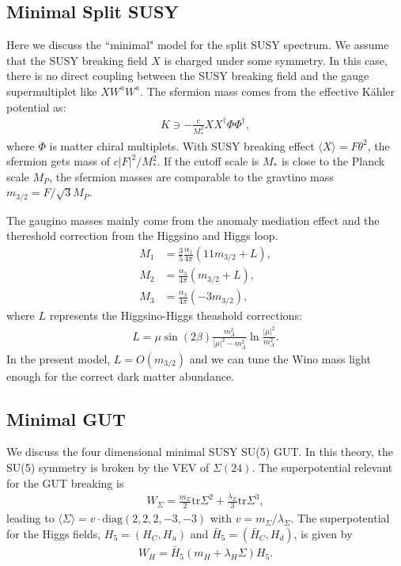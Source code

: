 \documentclass[12pt]{article}
\newcommand{\1}{\mbox{1}\hspace{-0.25em}\mbox{l}}
\begin{document}
\subsection{Minimal Split SUSY}
Here we discuss the ``minimal" model for the split SUSY spectrum.
We assume that the SUSY breaking field $X$ is charged under some symmetry.
In this case, there is no direct coupling between the SUSY breaking field and the gauge supermultiplet like $X W^{a} W^{a}$.
The sfermion mass comes from the effective K\"ahler potential as:
\begin{align}
    K \ni -\frac{c}{M^2_{*}} X X^{\dagger} \Phi \Phi^{\dagger},
\end{align}
where $\Phi$ is matter chiral multiplets. 
With SUSY breaking effect $\langle X \rangle = F \theta^2$, the sfermion gets mass of $c |F|^2/M_*^2$.
If the cutoff scale is $M_*$ is close to the Planck scale $M_P$, the sfermion masses are comparable to the gravtino mass $m_{3/2} = {F}/{\sqrt{3}M_P}$.

The gaugino masses mainly come from the anomaly mediation effect and the thereshold correction from the Higgsino and Higgs loop.
\begin{align}
  M_1 &= \frac{3}{5} \frac{\alpha_1}{4\pi} (11 m_{3/2} + L),\\
  M_2 &= \frac{\alpha_2}{4\pi} (m_{3/2} + L),\\
  M_3 &= \frac{\alpha_3}{4\pi} (-3 m_{3/2}),
\end{align}
where $L$ represents the Higgsino-Higgs theashold corrections:
\begin{align}
      L = \mu \sin(2\beta) \frac{m_A^2}{|\mu|^2 - m_A^2} 
    \ln\frac{|\mu|^2}{m_A^2}.
\end{align}
In the present model, $L = O(m_{3/2})$ and we can tune the Wino mass light enough for the correct dark matter abundance.

\subsection{Minimal GUT}

We discuss the four dimensional minimal SUSY SU(5) GUT.
 In this theory, the SU(5) symmetry 
is broken by the VEV of $\Sigma(24)$.  The superpotential relevant 
for the GUT breaking is
%
\begin{align}
  W_\Sigma = \frac{m_\Sigma}{2} \mathrm{tr} \Sigma^2 
    + \frac{\lambda_\Sigma}{3} \mathrm{tr} \Sigma^3,
\label{eq:W_Sigma}
\end{align}
%
leading to $\langle \Sigma \rangle = v \cdot 
\mathrm{diag}(2,2,2,-3,-3)$ with $v = m_\Sigma/\lambda_\Sigma$. 
The superpotential for the Higgs fields, $H_5 = (H_C, H_u)$ 
and $\bar{H}_5 = (\bar{H}_C, H_d)$, is given by
%
\begin{align}
  W_H = \bar{H}_5 ( m_H + \lambda_H \Sigma ) H_5.
\label{eq:W_H}
\end{align}
\end{document}
